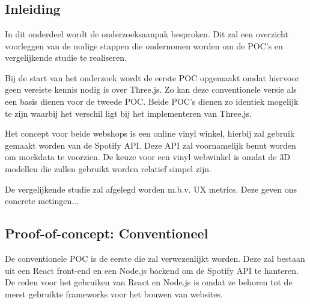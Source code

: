 
\chapter{}%
\label{ch:methodologie}

\section{Inleiding}

In dit onderdeel wordt de onderzoeksaanpak besproken. Dit zal een overzicht voorleggen van de  nodige stappen die ondernomen worden om de POC's en vergelijkende studie te realiseren.

Bij de start van het onderzoek wordt de eerste POC opgemaakt omdat hiervoor geen vereiste kennis nodig is over Three.js. Zo kan deze conventionele versie als een basis dienen voor de tweede POC. Beide POC's dienen zo identiek mogelijk te zijn waarbij het verschil ligt bij het implementeren van Three.js.

Het concept voor beide webshops is een online vinyl winkel, hierbij zal gebruik gemaakt worden van de Spotify API. Deze API zal voornamelijk benut worden om mockdata te voorzien. De keuze voor een vinyl webwinkel is omdat de 3D modellen die zullen gebruikt worden relatief simpel zijn.

De vergelijkende studie zal afgelegd worden m.b.v. UX metrics. Deze geven ons concrete metingen...

\section{Proof-of-concept: Conventioneel}

De conventionele POC is de eerste die zal verwezenlijkt worden. Deze zal bestaan uit een React front-end en een Node.js backend om de Spotify API te hanteren. De reden voor het gebruiken van React en Node.js is omdat ze behoren tot de meest gebruikte frameworks voor het bouwen van websites.

